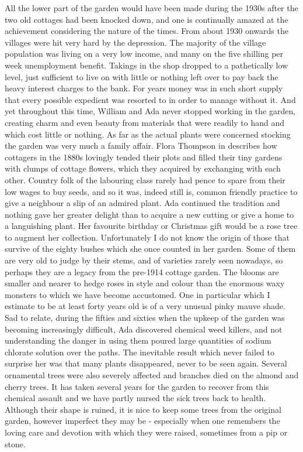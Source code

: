 All the lower part of the garden would have been made during the 1930s after the two old cottages had been knocked down, and one is continually amazed at the achievement considering the nature of the times. From about 1930 onwards the villages were hit very hard by the depression. The majority of the village population was living on a very low income, and many on the five shilling per week unemployment benefit. Takings in the shop dropped to a pathetically low level, just sufficient to live on with little or nothing left over to pay back the heavy interest charges to the bank. For years money was in such short supply that every possible expedient was resorted to in order to manage without it. And yet throughout this time, William and Ada never stopped working in the garden, creating charm and even beauty from materials that were readily to hand and which cost little or nothing. As far as the actual plants were concerned stocking the garden was very much a family affair. Flora Thompson in  describes how cottagers in the 1880s lovingly tended their plots and filled their tiny gardens with clumps of cottage flowers, which they acquired by exchanging with each other. Country folk of the labouring class rarely had pence to spare from their low wages to buy seeds, and so it was, indeed still is, common friendly practice to give a neighbour a slip of an admired plant. Ada continued the tradition and nothing gave her greater delight than to acquire a new cutting or give a home to a languishing plant. Her favourite birthday or Christmas gift would be a rose tree to augment her collection. Unfortunately I do not know the origin of those that survive of the eighty bushes which she once counted in her garden. Some of them are very old to judge by their stems, and of varieties rarely seen nowadays, so perhaps they are a legacy from the pre-1914 cottage garden. The blooms are smaller and nearer to hedge roses in style and colour than the enormous waxy monsters to which we have become accustomed. One in particular which I estimate to be at least forty years old is of a very unusual pinky mauve shade. Sad to relate, during the fifties and sixties when the upkeep of the garden was becoming increasingly difficult, Ada discovered chemical weed killers, and not understanding the danger in using them poured large quantities of sodium chlorate solution over the paths. The inevitable result which never failed to surprise her was that many plants disappeared, never to be seen again. Several ornamental trees were also severely affected and branches died on the almond and cherry trees. It has taken several years for the garden to recover from this chemical assault and we have partly nursed the sick trees back to health. Although their shape is ruined, it is nice to keep some trees from the original garden, however imperfect they may be - especially when one remembers the loving care and devotion with which they were raised, sometimes from a pip or stone.

